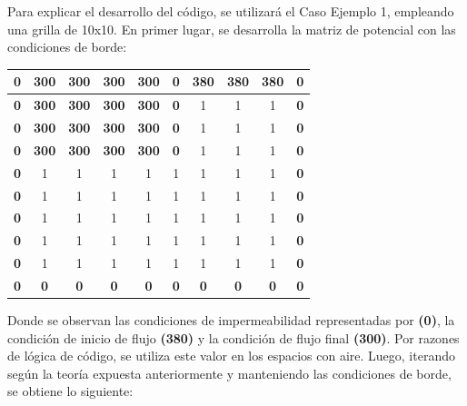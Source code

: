 Para explicar el desarrollo del código, se utilizará el Caso Ejemplo 1, empleando una grilla de 10x10. En primer lugar, se desarrolla la matriz de potencial con las condiciones de borde:

\begin{center}
    \begin{tabular}{|c|c|c|c|c|c|c|c|c|c|} 
        \hline
        \textbf{0} & \textbf{300} & \textbf{300} & \textbf{300} & \textbf{300} & \textbf{0} & \textbf{380} & \textbf{380} & \textbf{380} & \textbf{0} \\
        \hline
        \textbf{0} & \textbf{300} & \textbf{300} & \textbf{300} & \textbf{300} & \textbf{0} & 1 & 1 & 1 & \textbf{0} \\
        \hline
        \textbf{0} & \textbf{300} & \textbf{300} & \textbf{300} & \textbf{300} & \textbf{0} & 1 & 1 & 1 & \textbf{0} \\
        \hline
        \textbf{0} & \textbf{300} & \textbf{300} & \textbf{300} & \textbf{300} & \textbf{0} & 1 & 1 & 1 & \textbf{0} \\
        \hline
        \textbf{0} & 1 & 1 & 1 & 1 & 1 & 1 & 1 & 1 & \textbf{0} \\
        \hline
        \textbf{0} & 1 & 1 & 1 & 1 & 1 & 1 & 1 & 1 & \textbf{0} \\
        \hline
        \textbf{0} & 1 & 1 & 1 & 1 & 1 & 1 & 1 & 1 & \textbf{0} \\
        \hline
        \textbf{0} & 1 & 1 & 1 & 1 & 1 & 1 & 1 & 1 & \textbf{0} \\
        \hline
        \textbf{0} & 1 & 1 & 1 & 1 & 1 & 1 & 1 & 1 & \textbf{0} \\
        \hline
        \textbf{0} & \textbf{0} & \textbf{0} & \textbf{0} & \textbf{0} & \textbf{0} & \textbf{0} & \textbf{0} & \textbf{0} & \textbf{0} \\
        \hline
    \end{tabular}
\end{center}

Donde se observan las condiciones de impermeabilidad representadas por \textbf{(0)}, la condición de inicio de flujo \textbf{(380)} y la condición de flujo final \textbf{(300)}. Por razones de lógica de código, se utiliza este valor en los espacios con aire. Luego, iterando según la teoría expuesta anteriormente y manteniendo las condiciones de borde, se obtiene lo siguiente:


